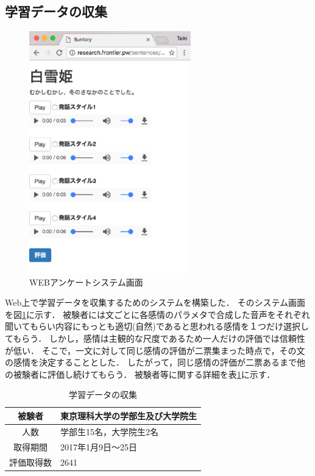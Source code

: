 \subsection{学習データの収集}
\begin{figure}[h]
  \begin{center}
    \includegraphics[clip,width=7.0cm]{fig/web.eps}
    \caption{WEBアンケートシステム画面}
    \label{fig:web}
  \end{center}
\end{figure}

Web上で学習データを収集するためのシステムを構築した．
そのシステム画面を図\ref{fig:web}に示す．
被験者には文ごとに各感情のパラメタで合成した音声をそれぞれ聞いてもらい内容にもっとも適切(自然)であると思われる感情を１つだけ選択してもらう．
しかし，感情は主観的な尺度であるため一人だけの評価では信頼性が低い．
そこで，一文に対して同じ感情の評価が二票集まった時点で，その文の感情を決定することとした．
したがって，同じ感情の評価が二票あるまで他の被験者に評価し続けてもらう．
被験者等に関する詳細を表\ref{enviroment}に示す．

\begin{table}[h]
  \begin{center}
  \caption{学習データの収集}
  \label{enviroment}
  \begin{tabular}{|c|l|}
    \hline
    被験者 & 東京理科大学の学部生及び大学院生 \\ \hline
    人数 & 学部生15名，大学院生2名 \\ \hline
    取得期間 & 2017年1月9日〜25日 \\ \hline
    評価取得数 & 2641 \\ \hline
  \end{tabular}
  \end{center}
\end{table}


